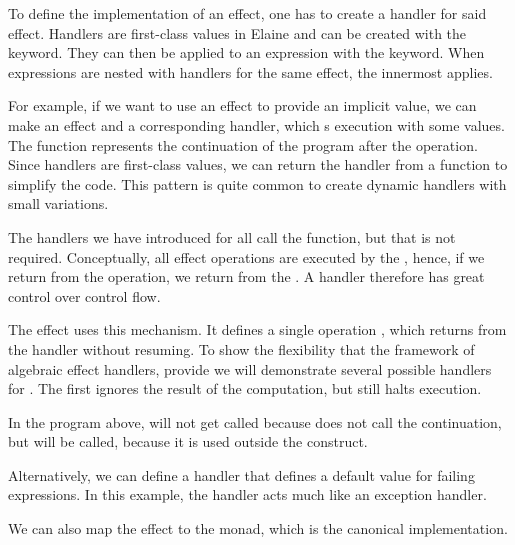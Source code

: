 To define the implementation of an effect, one has to create a handler for said effect. Handlers are first-class values in Elaine and can be created with the  keyword. They can then be applied to an expression with the  keyword. When  expressions are nested with handlers for the same effect, the innermost  applies.

For example, if we want to use an effect to provide an implicit value, we can make an effect  and a corresponding handler, which s execution with some values. The  function represents the continuation of the program after the operation. Since handlers are first-class values, we can return the handler from a function to simplify the code. This pattern is quite common to create dynamic handlers with small variations.



The handlers we have introduced for  all call the  function, but that is not required. Conceptually, all effect operations are executed by the , hence, if we return from the operation, we return from the . A handler therefore has great control over control flow.

The  effect uses this mechanism. It defines a single operation , which returns from the handler without resuming. To show the flexibility that the framework of algebraic effect handlers, provide we will demonstrate several possible handlers for . The first ignores the result of the computation, but still halts execution.



In the program above,  will not get called because  does not call the continuation, but  will be called, because it is used outside the  construct.

Alternatively, we can define a handler that defines a default value for failing expressions. In this example, the handler acts much like an exception handler.



We can also map the  effect to the  monad, which is the canonical implementation.


